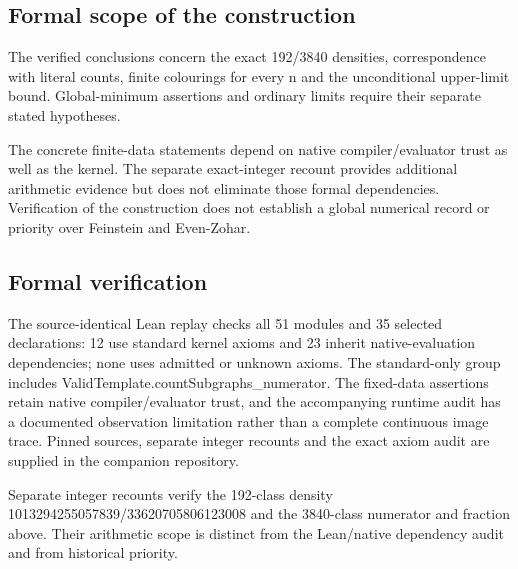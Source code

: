 \documentclass[11pt,a4paper]{article}
\begin{document}
\subsection{Formal scope of the construction}
The verified conclusions concern the exact 192/3840 densities, correspondence with literal counts, finite colourings for every n and the unconditional upper-limit bound. Global-minimum assertions and ordinary limits require their separate stated hypotheses.

The concrete finite-data statements depend on native compiler/evaluator trust as well as the kernel. The separate exact-integer recount provides additional arithmetic evidence but does not eliminate those formal dependencies. Verification of the construction does not establish a global numerical record or priority over Feinstein and Even-Zohar.

\subsection{Formal verification}
The source-identical Lean replay checks all 51 modules and 35 selected declarations: 12 use standard kernel axioms and 23 inherit native-evaluation dependencies; none uses admitted or unknown axioms. The standard-only group includes ValidTemplate.countSubgraphs\_numerator. The fixed-data assertions retain native compiler/evaluator trust, and the accompanying runtime audit has a documented observation limitation rather than a complete continuous image trace. Pinned sources, separate integer recounts and the exact axiom audit are supplied in the companion repository.

{\small Separate integer recounts verify the 192-class density 1013294255057839/33620705806123008 and the 3840-class numerator and fraction above. Their arithmetic scope is distinct from the Lean/native dependency audit and from historical priority.\par}
\end{document}
